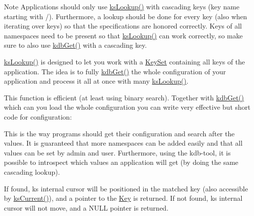 \begin{DoxyNote}{Note}
Applications should only use \hyperlink{group__keyset_gaa34fc43a081e6b01e4120daa6c112004}{ks\+Lookup()} with cascading keys (key name starting with {\ttfamily /}). Furthermore, a lookup should be done for every key (also when iterating over keys) so that the specifications are honored correctly. Keys of all namespaces need to be present so that \hyperlink{group__keyset_gaa34fc43a081e6b01e4120daa6c112004}{ks\+Lookup()} can work correctly, so make sure to also use \hyperlink{group__kdb_ga28e385fd9cb7ccfe0b2f1ed2f62453a1}{kdb\+Get()} with a cascading key.
\end{DoxyNote}
{\ttfamily \hyperlink{group__keyset_gaa34fc43a081e6b01e4120daa6c112004}{ks\+Lookup()}} is designed to let you work with a \hyperlink{classkdb_1_1KeySet}{Key\+Set} containing all keys of the application. The idea is to fully \hyperlink{group__kdb_ga28e385fd9cb7ccfe0b2f1ed2f62453a1}{kdb\+Get()} the whole configuration of your application and process it all at once with many {\ttfamily \hyperlink{group__keyset_gaa34fc43a081e6b01e4120daa6c112004}{ks\+Lookup()}}.

This function is efficient (at least using binary search). Together with \hyperlink{group__kdb_ga28e385fd9cb7ccfe0b2f1ed2f62453a1}{kdb\+Get()} which can you load the whole configuration you can write very effective but short code for configuration\+:


 This is the way programs should get their configuration and search after the values. It is guaranteed that more namespaces can be added easily and that all values can be set by admin and user. Furthermore, using the kdb-\/tool, it is possible to introspect which values an application will get (by doing the same cascading lookup).

If found, {\ttfamily ks} internal cursor will be positioned in the matched key (also accessible by \hyperlink{group__keyset_ga4287b9416912c5f2ab9c195cb74fb094}{ks\+Current()}), and a pointer to the \hyperlink{classkdb_1_1Key}{Key} is returned. If not found, {\ttfamily ks} internal cursor will not move, and a N\+U\+LL pointer is returned.

